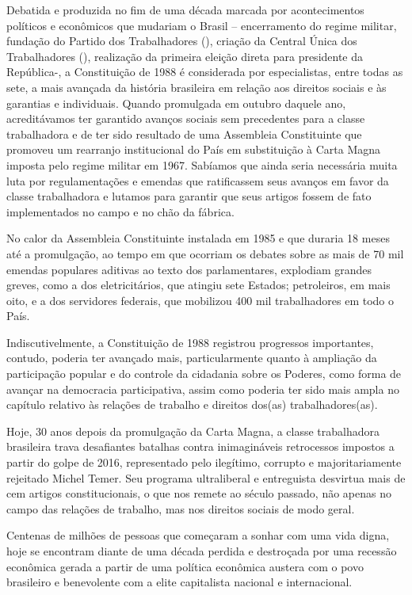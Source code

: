 Debatida e produzida no fim de uma década marcada por acontecimentos
políticos e econômicos que mudariam o Brasil -- encerramento do regime
militar, fundação do Partido dos Trabalhadores (), criação da Central
Única dos Trabalhadores (), realização da primeira eleição direta
para presidente da República-, a Constituição de 1988 é considerada por
especialistas, entre todas as sete, a mais avançada da história
brasileira em relação aos direitos sociais e às garantias e individuais.
Quando promulgada em outubro daquele ano, acreditávamos ter garantido
avanços sociais sem precedentes para a classe trabalhadora e de ter sido
resultado de uma Assembleia Constituinte que promoveu um rearranjo
institucional do País em substituição à Carta Magna imposta pelo regime
militar em 1967. Sabíamos que ainda seria necessária muita luta por
regulamentações e emendas que ratificassem seus avanços em favor da
classe trabalhadora e lutamos para garantir que seus artigos fossem de
fato implementados no campo e no chão da fábrica.

No calor da Assembleia Constituinte instalada em 1985 e que duraria 18
meses até a promulgação, ao tempo em que ocorriam os debates sobre as
mais de 70 mil emendas populares aditivas ao texto dos parlamentares,
explodiam grandes greves, como a dos eletricitários, que atingiu sete
Estados; petroleiros, em mais oito, e a dos servidores federais, que
mobilizou 400 mil trabalhadores em todo o País.

Indiscutivelmente, a Constituição de 1988 registrou progressos
importantes, contudo, poderia ter avançado mais, particularmente quanto
à ampliação da participação popular e do controle da cidadania sobre os
Poderes, como forma de avançar na democracia participativa, assim como
poderia ter sido mais ampla no capítulo relativo às relações de trabalho
e direitos dos(as) trabalhadores(as).

Hoje, 30 anos depois da promulgação da Carta Magna, a classe
trabalhadora brasileira trava desafiantes batalhas contra inimagináveis
retrocessos impostos a partir do golpe de 2016, representado pelo
ilegítimo, corrupto e majoritariamente rejeitado Michel Temer. Seu
programa ultraliberal e entreguista desvirtua mais de cem artigos
constitucionais, o que nos remete ao século passado, não apenas no campo
das relações de trabalho, mas nos direitos sociais de modo geral.

Centenas de milhões de pessoas que começaram a sonhar com uma vida
digna, hoje se encontram diante de uma década perdida e destroçada por
uma recessão econômica gerada a partir de uma política econômica austera
com o povo brasileiro e benevolente com a elite capitalista nacional e
internacional.


